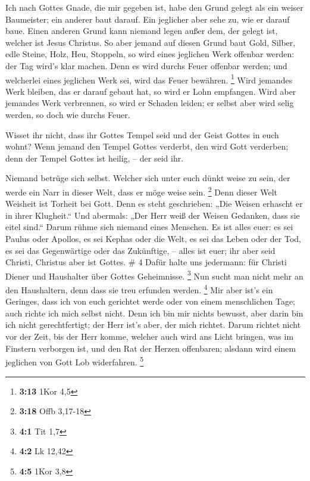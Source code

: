  Ich nach Gottes Gnade, die mir gegeben ist, habe den
Grund gelegt als ein weiser Baumeister; ein anderer baut darauf. Ein
jeglicher aber sehe zu, wie er darauf baue.  Einen
anderen Grund kann niemand legen außer dem, der gelegt ist, welcher ist
Jesus Christus.  So aber jemand auf diesen Grund baut
Gold, Silber, edle Steine, Holz, Heu, Stoppeln,  so wird
eines jeglichen Werk offenbar werden: der Tag wird's klar machen. Denn
es wird durchs Feuer offenbar werden; und welcherlei eines jeglichen
Werk sei, wird das Feuer bewähren. \footnote{\textbf{3:13} 1Kor 4,5}
 Wird jemandes Werk bleiben, das er darauf gebaut hat, so
wird er Lohn empfangen.  Wird aber jemandes Werk
verbrennen, so wird er Schaden leiden; er selbst aber wird selig werden,
so doch wie durchs Feuer.

 Wisset ihr nicht, dass ihr Gottes Tempel seid und der
Geist Gottes in euch wohnt?  Wenn jemand den Tempel
Gottes verderbt, den wird Gott verderben; denn der Tempel Gottes ist
heilig, -- der seid ihr.

 Niemand betrüge sich selbst. Welcher sich unter euch
dünkt weise zu sein, der werde ein Narr in dieser Welt, dass er möge
weise sein. \footnote{\textbf{3:18} Offb 3,17-18}  Denn
dieser Welt Weisheit ist Torheit bei Gott. Denn es steht geschrieben:
„Die Weisen erhascht er in ihrer Klugheit.``  Und
abermals: „Der Herr weiß der Weisen Gedanken, dass sie eitel sind.``
 Darum rühme sich niemand eines Menschen. Es ist alles
euer:  es sei Paulus oder Apollos, es sei Kephas oder die
Welt, es sei das Leben oder der Tod, es sei das Gegenwärtige oder das
Zukünftige, -- alles ist euer;  ihr aber seid Christi,
Christus aber ist Gottes. \# 4  Dafür halte uns jedermann:
für Christi Diener und Haushalter über Gottes Geheimnisse. \footnote{\textbf{4:1}
  Tit 1,7}  Nun sucht man nicht mehr an den Haushaltern,
denn dass sie treu erfunden werden. \footnote{\textbf{4:2} Lk 12,42}
 Mir aber ist's ein Geringes, dass ich von euch gerichtet
werde oder von einem menschlichen Tage; auch richte ich mich selbst
nicht.  Denn ich bin mir nichts bewusst, aber darin bin
ich nicht gerechtfertigt; der Herr ist's aber, der mich richtet.
 Darum richtet nicht vor der Zeit, bis der Herr komme,
welcher auch wird ans Licht bringen, was im Finstern verborgen ist, und
den Rat der Herzen offenbaren; alsdann wird einem jeglichen von Gott Lob
widerfahren. \footnote{\textbf{4:5} 1Kor 3,8}

